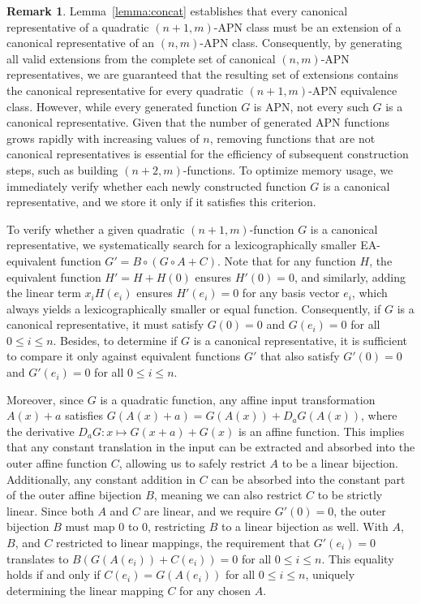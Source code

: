 \documentclass{amsart}[11pt]
\theoremstyle{plain}
\theoremstyle{definition}
\newtheorem{remark}[theorem]{Remark}
\numberwithin{theorem}{section}
\numberwithin{equation}{section}
\numberwithin{table}{section}
\numberwithin{figure}{section}
\numberwithin{algorithm}{section}
\begin{document}
\begin{remark}
    Lemma~\ref{lemma:concat} establishes that every canonical representative of a quadratic $(n+1,m)$-APN class must be an extension of a canonical representative of an $(n,m)$-APN class.
    Consequently, by generating all valid extensions from the complete set of canonical $(n,m)$-APN representatives, we are guaranteed that the resulting set of extensions contains the canonical representative for every quadratic $(n+1,m)$-APN equivalence class.
    However, while every generated function $G$ is APN, not every such $G$ is a canonical representative.
    Given that the number of generated APN functions grows rapidly with increasing values of $n$, removing functions that are not canonical representatives is essential for the efficiency of subsequent construction steps, such as building $(n+2, m)$-functions.
    To optimize memory usage, we immediately verify whether each newly constructed function $G$ is a canonical representative, and we store it only if it satisfies this criterion.
\end{remark}

To verify whether a given quadratic $(n+1,m)$-function $G$ is a canonical representative, we systematically search for a lexicographically smaller EA-equivalent function $G' = B \circ (G \circ A + C)$.
Note that for any function $H$, the equivalent function $H' = H + H(0)$ ensures $H'(0) = 0$, and similarly, adding the linear term $x_i H(e_i)$ ensures $H'(e_i) = 0$ for any basis vector $e_i$, which always yields a lexicographically smaller or equal function.
Consequently, if $G$ is a canonical representative, it must satisfy $G(0) = 0$ and $G(e_i) = 0$ for all $0 \le i \le n$.
Besides, to determine if $G$ is a canonical representative, it is sufficient to compare it only against equivalent functions $G'$ that also satisfy $G'(0) = 0$ and $G'(e_i) = 0$ for all $0 \le i \le n$.

Moreover, since $G$ is a quadratic function, any affine input transformation $A(x) + a$ satisfies $G(A(x) + a) = G(A(x)) + D_{a} G(A(x))$, where the derivative $D_{a} G \colon x \mapsto G(x+a) + G(x)$ is an affine function.
This implies that any constant translation in the input can be extracted and absorbed into the outer affine function $C$, allowing us to safely restrict $A$ to be a linear bijection.
Additionally, any constant addition in $C$ can be absorbed into the constant part of the outer affine bijection $B$, meaning we can also restrict $C$ to be strictly linear.
Since both $A$ and $C$ are linear, and we require $G'(0) = 0$, the outer bijection $B$ must map $0$ to $0$, restricting $B$ to a linear bijection as well.
With $A$, $B$, and $C$ restricted to linear mappings, the requirement that $G'(e_i) = 0$ translates to $B(G(A(e_i)) + C(e_i)) = 0$ for all $0 \le i \le n$.
This equality holds if and only if $C(e_i) = G(A(e_i))$ for all $0 \le i \le n$, uniquely determining the linear mapping $C$ for any chosen $A$.
\end{document}
